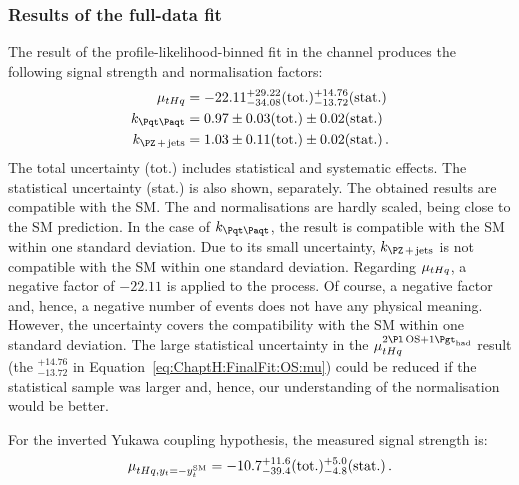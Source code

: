 \subsubsection{Results of the \dilepOStau full-data fit}
\label{sec:ChaptH:Fit:FullFit:OS:results}
The result of the profile-likelihood-binned fit in the \dilepOStau channel 
produces the following signal strength and normalisation factors:
\begin{align}
	\mu_{\tHq}	&= -22.11^{+29.22}_{-34.08} (\text{tot.}) ^{+14.76}_{-13.72} (\text{stat.})	\label{eq:ChaptH:FinalFit:OS:mu} \\
	k_{\ttbar}		&= 0.97 \pm 0.03 (\text{tot.}) \pm 0.02 (\text{stat.}) 		\label{eq:ChaptH:FinalFit:OS:ktt}\\
	k_{\Zjets}		&= 1.03 \pm 0.11 (\text{tot.}) \pm 0.02 (\text{stat.})  		\label{eq:ChaptH:FinalFit:OS:zjets}\, .
\end{align}
The total uncertainty (tot.) includes statistical and systematic effects.
The statistical uncertainty (stat.) is also shown, separately.
The obtained results are compatible with the SM. The 
\ttbar and \Zjets normalisations are hardly scaled, being close to the SM prediction.
In the case of $k_{\ttbar}$, the result is compatible with the SM within one
standard deviation. Due to its small uncertainty, $k_{\Zjets}$ is not compatible with
the SM within one standard deviation. 
Regarding $\mu_{tHq}$,  a negative factor of $-22.11$ is applied to the \tHq process. 
Of course, a negative factor and, hence, a negative number of events does not have any physical meaning.
However, the uncertainty covers the compatibility with the SM within one standard deviation.
The large statistical uncertainty in the $\mu^{\dilepOStau}_{\tHq}$ result (the $^{+14.76}_{-13.72}$ in Equation~\ref{eq:ChaptH:FinalFit:OS:mu}) could be reduced if the statistical sample was larger and, hence, our understanding
of the \tHq normalisation would be better. 

For the inverted Yukawa coupling hypothesis, the measured signal strength is:
\begin{equation*}
	 \mu_{tHq, y_{t}=-y_{t}^{\text{SM}}} = -10.7^{+11.6}_{-39.4} (\text{tot.}) ^{+5.0}_{-4.8} (\text{stat.}) \label{eq:ChaptH:FullFit:OS:POIs:mu_ytm1} \,.
\end{equation*}


